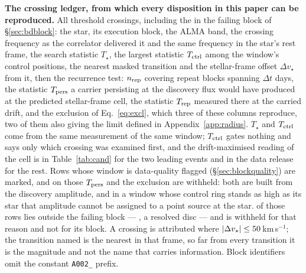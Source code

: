 \begin{table}
\centering
\caption{\textbf{The crossing ledger, from which every disposition in this
paper can be reproduced.} All \EvNCrossRaw{} threshold crossings,
including the \EvNCrossFlag{} in the failing block of \S\ref{sec:bdblock}:
the star, its execution block, the ALMA band, the crossing
frequency as the correlator delivered it and the same frequency in the star's
rest frame, the search statistic $T_\star$, the largest statistic
$T_{\rm ctrl}$ among the window's \NCtrl{} control positions, the nearest
masked transition and the stellar-frame offset $\Delta v_\star$ from it, then
the recurrence test: $n_{\rm rep}$ covering repeat blocks spanning $\Delta t$
days, the statistic $T_{\rm pers}$ a carrier persisting at the discovery flux
would have produced at the predicted stellar-frame cell, the statistic
$T_{\rm rep}$ measured there at the carried drift, and the exclusion of
Eq.~\ref{eq:excl}, which three of these columns reproduce, two of them also
giving the limit defined in Appendix~\ref{app:radius}.
$T_\star$ and $T_{\rm ctrl}$ come from the same measurement of the
same window; $T_{\rm ctrl}$ gates nothing and says only which crossing was
examined first, and the drift-maximised reading of the cell is in
Table~\ref{tab:cand} for the two leading events and in the data release for
the rest. Rows whose window is data-quality flagged
(\S\ref{sec:blockquality}) are marked, and on those $T_{\rm pers}$ and the
exclusion are withheld: both are built from the discovery amplitude, and in a
window whose control ring stands as high as its star that amplitude cannot be
assigned to a point source at the star. \BkFlagNCrossOther{} of those rows
lies outside the failing block --- \BkFlagOtherStar, a resolved disc --- and
is withheld for that reason and not for its block. A
crossing is attributed where
$|\Delta v_\star|\le\MaskHalfKms$\,km\,s$^{-1}$; the transition named is the
nearest in that frame, so far from every transition it is the magnitude and
not the name that carries information. Block identifiers omit the constant
\texttt{A002\_} prefix.}
\label{tab:ledger}
\tiny

\end{table}

